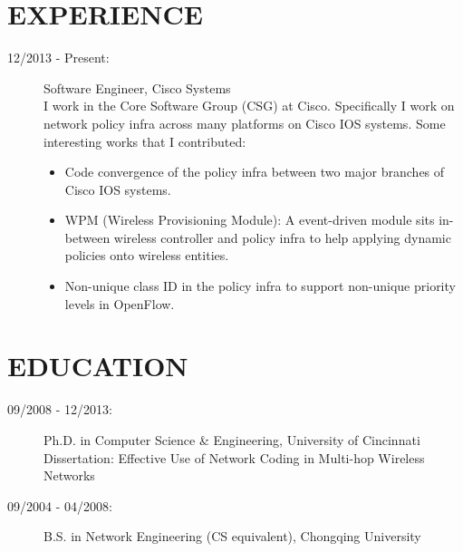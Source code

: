 \documentclass[line]{res}
\begin{document}
\address{350 Elan Village Ln \#111 \\ San Jose, CA 95134 \\ 513-679-0772}
\address{Email: \href{mailto:yang@yangchi.me}{yang@yangchi.me} \\ Github: \url{https://github.com/yangchi} }

\begin{resume}
	\section{EXPERIENCE}
	\begin{description}
		\item[12/2013 - Present:] Software Engineer, Cisco Systems \\
		I work in the Core Software Group (CSG) at Cisco. Specifically I work on network policy infra across many platforms on Cisco IOS systems. Some interesting works that I contributed:
        \begin{itemize}
            \item Code convergence of the policy infra between two major branches of Cisco IOS systems.
            \item WPM (Wireless Provisioning Module): A event-driven module sits in-between wireless controller and policy infra to help applying dynamic policies onto wireless entities.
			\item Non-unique class ID in the policy infra to support non-unique priority levels in OpenFlow.
		\end{itemize}
	\end{description}
	\section{EDUCATION}
	\begin{description}
		\item[09/2008 - 12/2013:] Ph.D. in Computer Science \& Engineering, University of Cincinnati\\
			Dissertation: Effective Use of Network Coding in Multi-hop Wireless Networks
		\item[09/2004 - 04/2008:] B.S. in Network Engineering (CS equivalent), Chongqing University
	\end{description}
	

\end{resume}
\end{document}
